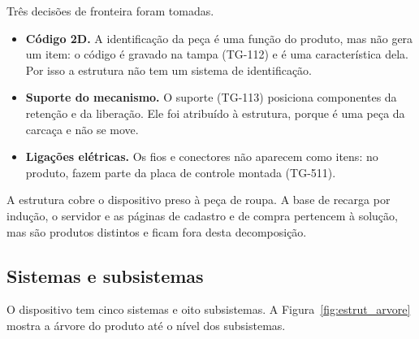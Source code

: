 Três decisões de fronteira foram tomadas.

\begin{itemize}
    \item \textbf{Código 2D.} A identificação da peça é uma função do produto, mas não gera um item: o código é gravado na tampa (TG-112) e é uma característica dela. Por isso a estrutura não tem um sistema de identificação.
    \item \textbf{Suporte do mecanismo.} O suporte (TG-113) posiciona componentes da retenção e da liberação. Ele foi atribuído à estrutura, porque é uma peça da carcaça e não se move.
    \item \textbf{Ligações elétricas.} Os fios e conectores não aparecem como itens: no produto, fazem parte da placa de controle montada (TG-511).
\end{itemize}

A estrutura cobre o dispositivo preso à peça de roupa. A base de recarga por indução, o servidor e as páginas de cadastro e de compra pertencem à solução, mas são produtos distintos e ficam fora desta decomposição.

\subsection{Sistemas e subsistemas}
\label{subsec:estrut_sistemas}

O dispositivo tem cinco sistemas e oito subsistemas. A Figura~\ref{fig:estrut_arvore} mostra a árvore do produto até o nível dos subsistemas.

